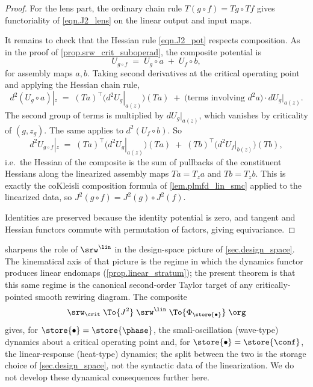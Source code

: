 \begin{proof}
For the lens part, the ordinary chain rule $T(g\circ f)=Tg\circ Tf$ gives functoriality of \eqref{eqn.J2_lens} on the linear output and input maps.

It remains to check that the Hessian rule \eqref{eqn.J2_pot} respects composition. As in the proof of \cref{prop.srw_crit_suboperad}, the composite potential is
\[
U_{g\circ f}\;=\;U_g\circ a\;+\;U_f\circ b,
\]
for assembly maps $a,b$. Taking second derivatives at the critical operating point and applying the Hessian chain rule,
\[
d^2(U_g\circ a)|_z \;=\; (Ta)^\top\bigl(d^2U_g|_{a(z)}\bigr)(Ta) \;+\; \bigl(\text{terms involving }d^2 a\bigr)\!\cdot\!dU_g|_{a(z)}.
\]
The second group of terms is multiplied by $dU_g|_{a(z)}$, which vanishes by criticality of $(g,z_g)$. The same applies to $d^2(U_f\circ b)$. So
\[
d^2 U_{g\circ f}|_z\;=\;(Ta)^\top\bigl(d^2U_g|_{a(z)}\bigr)(Ta)\;+\;(Tb)^\top\bigl(d^2U_f|_{b(z)}\bigr)(Tb),
\]
i.e.\ the Hessian of the composite is the sum of pullbacks of the constituent Hessians along the linearized assembly maps $Ta=T_z a$ and $Tb=T_z b$. This is exactly the coKleisli composition formula of \cref{lem.plmfd_lin_smc} applied to the linearized data, so $J^2(g\circ f)=J^2(g)\circ J^2(f)$.

Identities are preserved because the identity potential is zero, and tangent and Hessian functors commute with permutation of factors, giving equivariance.\qedhere
\end{proof}

\begin{remark}\label{rmk.srw_lin_taylor_target}
 sharpens the role of $\srw^{\lin}$ in the design-space picture of \cref{sec.design_space}. The kinematical axis of that picture is the regime in which the dynamics functor produces linear endomaps (\cref{prop.linear_stratum}); the present theorem is that this same regime is the canonical second-order Taylor target of any critically-pointed smooth rewiring diagram. The composite
\[
\srw_{\crit}\;\To{J^2}\;\srw^{\lin}\;\To{\Phi_\store{\bullet}}\;\org
\]
gives, for $\store{\bullet}=\store{\phase}$, the small-oscillation (wave-type) dynamics about a critical operating point and, for $\store{\bullet}=\store{\conf}$, the linear-response (heat-type) dynamics; the split between the two is the storage choice of \cref{sec.design_space}, not the syntactic data of the linearization. We do not develop these dynamical consequences further here.\qedhere
\end{remark}
